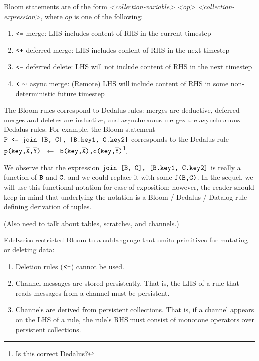 Bloom statements are of the form \textit{<collection-variable> <op> <collection-expression>}, where $op$ is one of the following:
\begin{enumerate}
\item $\tt{<=}$ merge: LHS includes content of RHS in the current timestep
\item $\tt{<+}$ deferred merge: LHS includes content of RHS in the next timestep
\item $\tt{<-}$ deferred delete: LHS will not include content of RHS in the next timestep 
\item $\tt{<}\sim$ async merge: (Remote) LHS will include content of RHS in some non-deterministic future timestep
\end{enumerate}
The Bloom rules correspond to Dedalus rules: merges are deductive, deferred merges and deletes are inductive, and asynchronous merges are asynchronous Dedalus rules.
For example, the Bloom statement $\tt{P <= join [B, C], [B.key1, C.key2]}$ corresponds to the Dedalus rule $\tt{p(key,}\overline{\tt{X}}\tt{,}\overline{\tt{Y}}\tt{)}$ $~\leftarrow~$ $\tt{b(key,}\overline{\tt{X}}\tt{),$ $c(key,}\overline{\tt{Y}}\tt{)}$\footnote{Is this correct Dedalus?}.

We observe that the expression $\tt{join [B, C], [B.key1, C.key2]}$ is really a function of $\tt{B}$ and $\tt{C}$, and we could replace it with some $\tt{f(B,C)}$.
In the sequel, we will use this functional notation for ease of exposition; however, the reader should keep in mind that underlying the notation is a Bloom / Dedalus / Datalog rule defining derivation of tuples.

(Also need to talk about tables, scratches, and channels.)

Edelweiss restricted Bloom to a sublanguage that omits primitives for mutating or deleting data:
\begin{enumerate}
\item Deletion rules ($\tt{<-}$) cannot be used.
\item Channel messages are stored persistently. That is, the LHS of a rule that reads messages from a channel must be persistent.
\item Channels are derived from persistent collections. That is, if a channel appears on the LHS of a rule, the rule's RHS must consist of monotone operators over persistent collections.
\end{enumerate}

